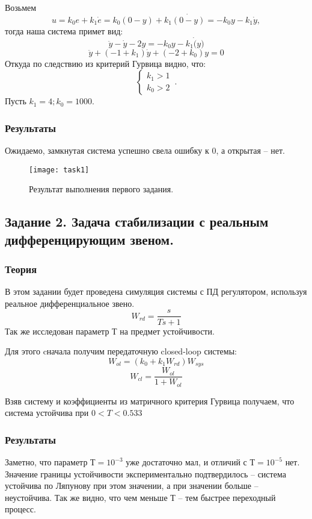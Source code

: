 \documentclass[16pt]{article}
\begin{document}
Возьмем \[u = k_0e + k_1\dot{e} = k_0(0 - y) + k_1\dot{(0 - y)} = -k_0y - k_1\dot{y},\] тогда наша система примет вид:
\[\ddot{y} - \dot{y} - 2y =  -k_0y - k_1\dot(y)\]
\[\ddot{y} + (- 1 + k_1)\dot{y} + (-2 + k_0)y = 0\]
Откуда по следствию из критерий Гурвица видно, что:
\begin{equation}
    \begin{cases}
        k_1 > 1\\
        k_0 > 2
    \end{cases}\,.
\end{equation}
Пусть \(k_1 = 4; k_0 = 1000\).

\subsubsection{Результаты}
Ожидаемо, замкнутая система успешно свела ошибку к 0, а открытая -- нет.
\begin{figure}[h!]
    \centering
    \texttt{[image: task1]}
    \caption{Результат выполнения первого задания.}
    \label{fig:fig1}
\end{figure}

\pagebreak

\subsection{Задание 2. Задача стабилизации с реальным дифференцирующим звеном.}

\subsubsection{Теория}
В этом задании будет проведена симуляция системы с ПД регулятором, используя реальное дифференциальное звено.
\[ W_{rd} = \frac{s}{Ts + 1}\]
Так же исследован параметр Т на предмет устойчивости.

Для этого cначала получим передаточную closed-loop системы:
\[ W_{ol} = (k_0 + k_1W_{rd}) W_{sys}\]
\[ W_{cl} = \frac{W_{ol}}{1 + W_{ol}}\]

Взяв систему и коэффициенты из матричного критерия Гурвица получаем, что система устойчива при \(0 < T < 0.533\)

\subsubsection{Результаты}
Заметно, что параметр \(Т=10^{-3}\) уже достаточно мал, и отличий с \(Т=10^{-5}\) нет. Значение границы устойчивости экспериментально подтвердилось -- система устойчива по Ляпунову при этом значении, а при значении больше -- неустойчива. Так же видно, что чем меньше Т -- тем быстрее переходный процесс.
\end{document}
